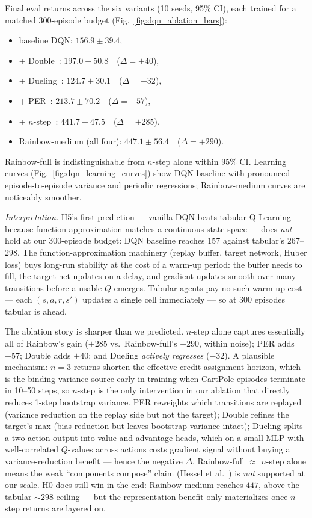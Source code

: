 \documentclass[conference]{IEEEtran}
\begin{document}
Final eval returns across the six variants (10 seeds, 95\% CI), each
trained for a matched 300-episode budget
(Fig.~\ref{fig:dqn_ablation_bars}):
\begin{itemize}
\itemsep0em
\item baseline DQN: $156.9 \pm 39.4$,
\item + Double~\cite{vanhasselt2016}: $197.0 \pm 50.8$~~($\Delta = +40$),
\item + Dueling~\cite{wang2016}: $124.7 \pm 30.1$~~($\Delta = -32$),
\item + PER~\cite{schaul2016}: $213.7 \pm 70.2$~~($\Delta = +57$),
\item + $n$-step~\cite{sutton1988}: $441.7 \pm 47.5$~~($\Delta = +285$),
\item Rainbow-medium (all four): $447.1 \pm 56.4$~~($\Delta = +290$).
\end{itemize}
Rainbow-full is indistinguishable from $n$-step alone within 95\% CI.
Learning curves (Fig.~\ref{fig:dqn_learning_curves}) show DQN-baseline
with pronounced episode-to-episode variance and periodic regressions;
Rainbow-medium curves are noticeably smoother.

\emph{Interpretation.} H5's first prediction --- vanilla DQN beats
tabular Q-Learning because function approximation matches a continuous
state space --- does \emph{not} hold at our 300-episode budget: DQN
baseline reaches $157$ against tabular's $267$--$298$. The
function-approximation machinery (replay buffer, target network, Huber
loss) buys long-run stability at the cost of a warm-up period: the
buffer needs to fill, the target net updates on a delay, and gradient
updates smooth over many transitions before a usable $Q$ emerges.
Tabular agents pay no such warm-up cost --- each $(s, a, r, s')$
updates a single cell immediately --- so at $300$ episodes tabular is
ahead.

The ablation story is sharper than we predicted. $n$-step alone
captures essentially all of Rainbow's gain
($+285$ vs.\ Rainbow-full's $+290$, within noise); PER adds $+57$;
Double adds $+40$; and Dueling \emph{actively regresses} ($-32$). A
plausible mechanism: $n = 3$ returns shorten the effective credit-assignment
horizon, which is the binding variance source early in training when
CartPole episodes terminate in 10--50 steps, so $n$-step is the only
intervention in our ablation that directly reduces 1-step bootstrap
variance. PER reweights which transitions are replayed (variance
reduction on the replay side but not the target); Double refines the
target's max (bias reduction but leaves bootstrap variance intact);
Dueling splits a two-action output into value and advantage heads,
which on a small MLP with well-correlated $Q$-values across actions
costs gradient signal without buying a variance-reduction benefit ---
hence the negative $\Delta$. Rainbow-full $\approx$ $n$-step alone
means the weak ``components compose'' claim
(Hessel et al.~\cite{hessel2018}) is \emph{not} supported at our scale.
H0 does still win in the end: Rainbow-medium reaches $447$, above
the tabular $\sim$$298$ ceiling --- but the representation benefit
only materializes once $n$-step returns are layered on.
\end{document}
